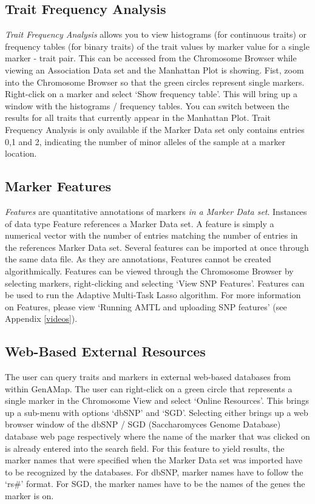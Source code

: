 \documentclass{article}
\begin{document}
\subsection{Trait Frequency Analysis}

{\it Trait Frequency Analysis} allows you to view histograms (for continuous traits) or frequency tables (for binary traits) of the trait values by marker value for a single marker - trait pair. This can be accessed from the Chromosome Browser while viewing an Association Data set and the Manhattan Plot is showing. Fist, zoom into the Chromosome Browser so that the green circles represent single markers. Right-click on a marker and select `Show frequency table'. This will bring up a window with the histograms / frequency tables. You can switch between the results for all traits that currently appear in the Manhattan Plot. Trait Frequency Analysis is only available if the Marker Data set only contains entries 0,1 and 2, indicating the number of minor alleles of the sample at a marker location.

\subsection{Marker Features}

{\it Features} are quantitative annotations of markers {\it in a Marker Data set}. Instances of data type Feature references a Marker Data set. A feature is simply a numerical vector with the number of entries matching the number of entries in the references Marker Data set. Several features can be imported at once through the same data file. As they are annotations, Features cannot be created algorithmically. Features can be viewed through the Chromosome Browser by selecting markers, right-clicking and selecting `View SNP Features'. Features can be used to run the Adaptive Multi-Task Lasso algorithm. For more information on Features, please view `Running AMTL and uploading SNP features' (see Appendix \ref{videos}).

\subsection{Web-Based External Resources}

The user can query traits and markers in external web-based databases from within GenAMap. The user can right-click on a green circle that represents a single marker in the Chromosome View and select `Online Resources'. This brings up a sub-menu with options `dbSNP' and `SGD'. Selecting either brings up a web browser window of the dbSNP / SGD (Saccharomyces Genome Database) database web page respectively where the name of the marker that was clicked on is already entered into the search field. For this feature to yield results, the marker names that were specified when the Marker Data set was imported have to be recognized by the databases. For dbSNP, marker names have to follow the `rs\#' format. For SGD, the marker names have to be the names of the genes the marker is on. \\
\end{document}
